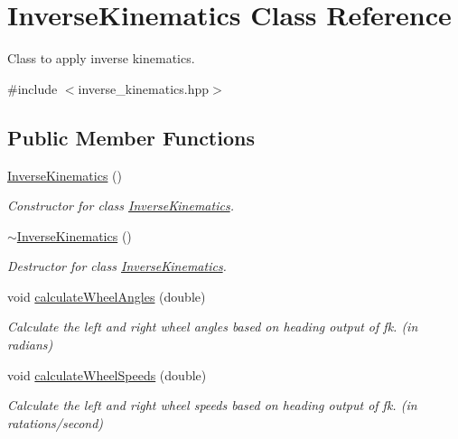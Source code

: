 \hypertarget{classInverseKinematics}{}\section{Inverse\+Kinematics Class Reference}
\label{classInverseKinematics}


Class to apply inverse kinematics.  




{\ttfamily \#include $<$inverse\+\_\+kinematics.\+hpp$>$}

\subsection*{Public Member Functions}
\begin{DoxyCompactItemize}
\item 
\mbox{\label{classInverseKinematics_a5ac416b45f9039ce28836cd73193d04b}} 
\hyperlink{classInverseKinematics_a5ac416b45f9039ce28836cd73193d04b}{Inverse\+Kinematics} ()
\begin{DoxyCompactList}\small\item\em Constructor for class \hyperlink{classInverseKinematics}{Inverse\+Kinematics}. \end{DoxyCompactList}\item 
\mbox{\label{classInverseKinematics_af82fba3aeac080112db67265438bf30c}} 
\hyperlink{classInverseKinematics_af82fba3aeac080112db67265438bf30c}{$\sim$\+Inverse\+Kinematics} ()
\begin{DoxyCompactList}\small\item\em Destructor for class \hyperlink{classInverseKinematics}{Inverse\+Kinematics}. \end{DoxyCompactList}\item 
void \hyperlink{classInverseKinematics_a5b4820979ff3b4b6e0a3346cd472fefe}{calculate\+Wheel\+Angles} (double)
\begin{DoxyCompactList}\small\item\em Calculate the left and right wheel angles based on heading output of fk. (in radians) \end{DoxyCompactList}\item 
void \hyperlink{classInverseKinematics_a7e72ae559e17363495da967d98fb7985}{calculate\+Wheel\+Speeds} (double)
\begin{DoxyCompactList}\small\item\em Calculate the left and right wheel speeds based on heading output of fk. (in ratations/second) \end{DoxyCompactList}\end{DoxyCompactItemize}


